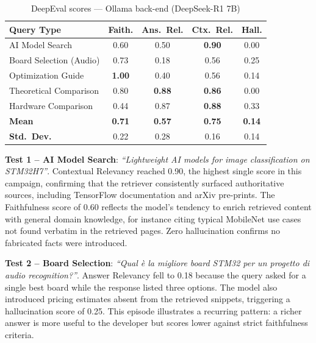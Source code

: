 \begin{table}[ht]
    \centering
    \caption{DeepEval scores --- Ollama back-end (DeepSeek-R1 7B)}
    \label{tab:deepeval-ollama}
    \begin{tabular}{|l|c|c|c|c|}
        \hline
        \textbf{Query Type}     & \textbf{Faith.} & \textbf{Ans.\ Rel.} & \textbf{Ctx.\ Rel.} & \textbf{Hall.} \\
        \hline
        AI Model Search         & 0.60            & 0.50                & \textbf{0.90}       & 0.00           \\
        Board Selection (Audio) & 0.73            & 0.18                & 0.56                & 0.25           \\
        Optimization Guide      & \textbf{1.00}   & 0.40                & 0.56                & 0.14           \\
        Theoretical Comparison  & 0.80            & \textbf{0.88}       & \textbf{0.86}       & 0.00           \\
        Hardware Comparison     & 0.44            & 0.87                & \textbf{0.88}       & 0.33           \\
        \hline
        \textbf{Mean}           & \textbf{0.71}   & \textbf{0.57}       & \textbf{0.75}       & \textbf{0.14}  \\
        \textbf{Std.\ Dev.}     & 0.22            & 0.28                & 0.16                & 0.14           \\
        \hline
    \end{tabular}
\end{table}

\textbf{Test 1 -- AI Model Search}: \textit{``Lightweight AI models for image classification on STM32H7''}. Contextual Relevancy reached 0.90, the highest single score in this campaign, confirming that the retriever consistently surfaced authoritative sources, including TensorFlow documentation and arXiv pre-prints. The Faithfulness score of 0.60 reflects the model's tendency to enrich retrieved content with general domain knowledge, for instance citing typical MobileNet use cases not found verbatim in the retrieved pages. Zero hallucination confirms no fabricated facts were introduced.

\textbf{Test 2 -- Board Selection}: \textit{``Qual è la migliore board STM32 per un progetto di audio recognition?''}. Answer Relevancy fell to 0.18 because the query asked for a single best board while the response listed three options. The model also introduced pricing estimates absent from the retrieved snippets, triggering a hallucination score of 0.25. This episode illustrates a recurring pattern: a richer answer is more useful to the developer but scores lower against strict faithfulness criteria.

